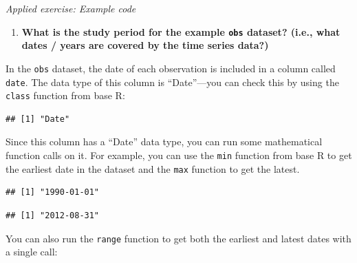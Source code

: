 \documentclass[
]{book}
\newenvironment{Shaded}{\begin{snugshade}}{\end{snugshade}}
\newcommand{\FunctionTok}[1]{\textcolor[rgb]{0.13,0.29,0.53}{\textbf{#1}}}
\newcommand{\NormalTok}[1]{#1}
\newcommand{\SpecialCharTok}[1]{\textcolor[rgb]{0.81,0.36,0.00}{\textbf{#1}}}
\providecommand{\tightlist}{%
  \setlength{\itemsep}{0pt}\setlength{\parskip}{0pt}}
\begin{document}
\emph{Applied exercise: Example code}

\begin{enumerate}
\def\labelenumi{\arabic{enumi}.}
\tightlist
\item
  \textbf{What is the study period for the example \texttt{obs} dataset? (i.e., what
  dates / years are covered by the time series data?)}
\end{enumerate}

In the \texttt{obs} dataset, the date of each observation is included in a column called
\texttt{date}. The data type of this column is ``Date''---you can check this by using
the \texttt{class} function from base R:

\begin{Shaded}
\end{Shaded}

\begin{verbatim}
## [1] "Date"
\end{verbatim}

Since this column has a ``Date'' data type, you can run some mathematical function
calls on it. For example, you can use the \texttt{min} function from base R to get the
earliest date in the dataset and the \texttt{max} function to get the latest.

\begin{Shaded}
\end{Shaded}

\begin{verbatim}
## [1] "1990-01-01"
\end{verbatim}

\begin{Shaded}
\end{Shaded}

\begin{verbatim}
## [1] "2012-08-31"
\end{verbatim}

You can also run the \texttt{range} function to get both the earliest and latest dates
with a single call:
\end{document}
